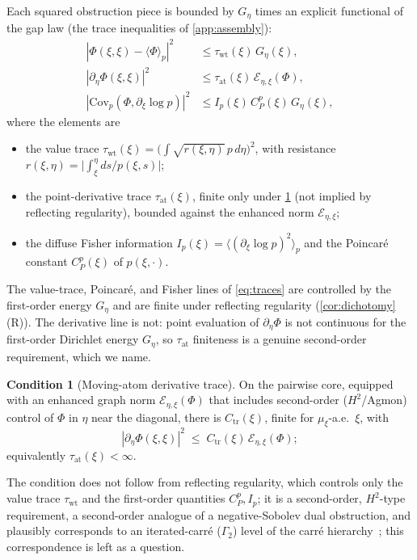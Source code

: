 \documentclass[reqno,final,11pt]{amsart}
\theoremstyle{plain}
\theoremstyle{definition}
\newtheorem{hypothesis}[theorem]{Condition}
\theoremstyle{remark}
\begin{document}
Each squared obstruction piece is bounded by $G_\eta$ times an explicit
functional of the gap law (the trace inequalities of \cref{app:assembly}):
\begin{equation}\label{eq:traces}
\begin{aligned}
  |\Phi(\xi,\xi)-\langle\Phi\rangle_p|^2 &\le \tau_{\mathrm{wt}}(\xi)\,G_\eta(\xi),\\
  |\partial_\eta\Phi(\xi,\xi)|^2 &\le \tau_{\mathrm{at}}(\xi)\,\mathcal E_{\eta,\xi}(\Phi),\\
  |\mathrm{Cov}_p(\Phi,\partial_\xi\log p)|^2 &\le I_p(\xi)\,C^p_P(\xi)\,G_\eta(\xi),
\end{aligned}
\end{equation}
where the elements are
\begin{itemize}
\item the value trace
  $\tau_{\mathrm{wt}}(\xi)=\bigl(\int\sqrt{r(\xi,\eta)}\,p\,d\eta\bigr)^2$, with
  resistance $r(\xi,\eta)=\bigl|\int_\xi^\eta ds/p(\xi,s)\bigr|$;
\item the point-derivative trace $\tau_{\mathrm{at}}(\xi)$, finite only
  under \cref{hyp:dtrace} (not implied by reflecting regularity), bounded
  against the enhanced norm $\mathcal E_{\eta,\xi}$;
\item the diffuse Fisher information
  $I_p(\xi)=\langle(\partial_\xi\log p)^2\rangle_p$ and the Poincar\'e
  constant $C^p_P(\xi)$ of $p(\xi,\cdot)$.
\end{itemize}

The value-trace, Poincar\'e, and Fisher lines of \eqref{eq:traces} are
controlled by the first-order energy $G_\eta$ and are finite under reflecting
regularity (\cref{cor:dichotomy}(R)). The derivative line is not: point
evaluation of $\partial_\eta\Phi$ is not continuous for the first-order
Dirichlet energy $G_\eta$, so $\tau_{\mathrm{at}}$ finiteness is a genuine
second-order requirement, which we name.

\begin{hypothesis}[Moving-atom derivative trace]\label{hyp:dtrace}
On the pairwise core, equipped with an enhanced graph norm $\mathcal
E_{\eta,\xi}(\Phi)$ that includes second-order ($H^2$/Agmon) control of $\Phi$
in $\eta$ near the diagonal, there is $C_{\mathrm{tr}}(\xi)$, finite for
$\mu_\xi$-a.e.\ $\xi$, with
\[
  |\partial_\eta\Phi(\xi,\xi)|^2\;\le\;C_{\mathrm{tr}}(\xi)\,\mathcal E_{\eta,\xi}(\Phi);
\]
equivalently $\tau_{\mathrm{at}}(\xi)<\infty$.
\end{hypothesis}

The condition does not follow from reflecting regularity, which controls only
the value trace $\tau_{\mathrm{wt}}$ and the first-order quantities
$C^p_P,I_p$; it is a second-order, $H^2$-type requirement, a second-order
analogue of a negative-Sobolev dual obstruction, and plausibly corresponds to
an iterated-carr\'e ($\Gamma_2$) level of the carr\'e
hierarchy~\citep{BGL}; this correspondence is left as a question.
\end{document}

